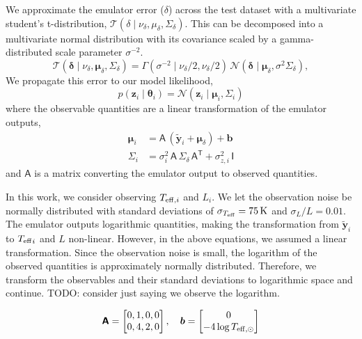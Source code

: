 \documentclass[fleqn,usenatbib]{mnras}
\newcommand{\teff}[1][]{{\ensuremath{T_{\mathrm{eff} \ifx#1\empty \else , #1 \fi}}}}
\newcommand{\normal}{\mathcal{N}}
\newcommand{\studentT}{\mathcal{T}}
\renewcommand*{\vec}[1]{\boldsymbol{#1}}
\newcommand*{\mat}[1]{\boldsymbol{\mathsf{#1}}}
\begin{document}
We approximate the emulator error (\(\delta\)) across the test dataset with a multivariate student's t-distribution, \(\studentT(\delta \mid \nu_\delta, \mu_\delta, \mat\Sigma_\delta)\). This can be decomposed into a multivariate normal distribution with its covariance scaled by a gamma-distributed scale parameter \(\sigma^{-2}\).
%
\begin{equation}
    \studentT(\vec\delta \mid \nu_\delta, \vec\mu_\delta, \mat\Sigma_\delta) = \Gamma(\sigma^{-2} \mid \nu_\delta/2, \nu_\delta/2) \, \normal(\vec\delta \mid \vec\mu_\delta, \sigma^2 \mat\Sigma_\delta),
\end{equation}
%
We propagate this error to our model likelihood,
%
\begin{equation}
    p(\vec z_i \mid \vec\theta_i) = \normal(\vec z_i \mid \vec\mu_i, \mat\Sigma_i)
\end{equation}
%
where the observable quantities are a linear transformation of the emulator outputs,
%
\begin{align}
    \vec\mu_i &= \mat A \, (\tilde{\vec y}_i + \vec\mu_\delta) + \vec b\\
    \mat\Sigma_i &= \sigma_i^2 \, \mat{A} \, \mat{\Sigma}_\delta \, \mat{A}^{\mathsf{T}} + \sigma_{z,i}^2 \, \mat{I} \label{eq:covariance}
\end{align}
%
and \(\mat A\) is a matrix converting the emulator output to observed quantities.

In this work, we consider observing \(\teff[i]\) and \(L_i\). We let the observation noise be normally distributed with standard deviations of \(\sigma_{\teff} = 75 \, \mathrm{K}\) and \(\sigma_L / L = 0.01\). The emulator outputs logarithmic quantities, making the transformation from \(\tilde{\vec y}_i\) to \(\teff_i\) and \(L\) non-linear. However, in the above equations, we assumed a linear transformation. Since the observation noise is small, the logarithm of the observed quantities is approximately normally distributed. Therefore, we transform the observables and their standard deviations to logarithmic space and continue. TODO: consider just saying we observe the logarithm.

\begin{equation}
    \mat A = 
    \begin{bmatrix}
        0, 1, 0, 0\\
        0, 4, 2, 0
    \end{bmatrix}
    , \quad
    \vec b =
    \begin{bmatrix}
        0\\
        - 4 \log \teff[\odot]
    \end{bmatrix}
\end{equation}
\end{document}
